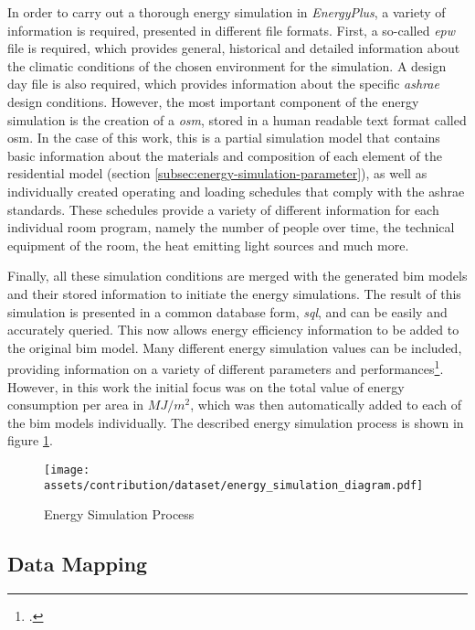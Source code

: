 \documentclass[a4paper, 12pt]{report}
\begin{document}
In order to carry out a thorough energy simulation in \textit{EnergyPlus}, a variety of information is required, presented in different file formats. First, a so-called \textit{\acrfull{epw}} file is required, which provides general, historical and detailed information about the climatic conditions of the chosen environment for the simulation. A design day file is also required, which provides information about the specific \textit{\acrfull{ashrae}} design conditions. However, the most important component of the energy simulation is the creation of a \textit{\acrlong{osm}}, stored in a human readable text format called \acrshort{osm}. In the case of this work, this is a partial simulation model that contains basic information about the materials and composition of each element of the residential model (section \ref{subsec:energy-simulation-parameter}), as well as individually created operating and loading schedules that comply with the \acrshort{ashrae} standards. These schedules provide a variety of different information for each individual room program, namely the number of people over time, the technical equipment of the room, the heat emitting light sources and much more.

Finally, all these simulation conditions are merged with the generated \acrshort{bim} models and their stored information to initiate the energy simulations. The result of this simulation is presented in a common database form, \textit{\acrfull{sql}}, and can be easily and accurately queried. This now allows energy efficiency information to be added to the original \acrshort{bim} model. Many different energy simulation values can be included, providing information on a variety of different parameters and performances\footcite{aksin2021use}. However, in this work the initial focus was on the total value of energy consumption per area in $MJ/m^2$, which was then automatically added to each of the \acrshort{bim} models individually. The described energy simulation process is shown in figure \ref{fig:energy-simulation-process}.

\begin{figure}
\centering
\texttt{[image: assets/contribution/dataset/energy\_simulation\_diagram.pdf]}
\caption{Energy Simulation Process}
\label{fig:energy-simulation-process}
\end{figure}

\subsection{Data Mapping}\label{subsec:data-mapping}
\end{document}
